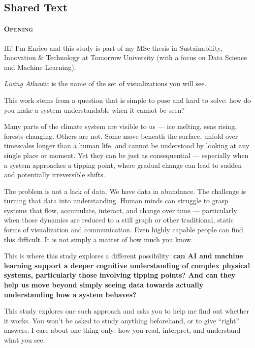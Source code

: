 \subsection{Shared Text}
\label{subsec:b-shared}

\small

\paragraph{\textsc{Opening}}
Hi! I'm Enrico and this study is part of my MSc thesis in Sustainability, Innovation \&
Technology at Tomorrow University (with a focus on Data Science and Machine Learning).

\emph{Living Atlantic} is the name of the set of visualizations you will see.

This work stems from a question that is simple to pose and hard to solve: how do you make a
system understandable when it cannot be seen?

Many parts of the climate system are visible to us --- ice melting, seas rising, forests
changing. Others are not. Some move beneath the surface, unfold over timescales longer than a
human life, and cannot be understood by looking at any single place or moment. Yet they can be
just as consequential --- especially when a system approaches a tipping point, where gradual
change can lead to sudden and potentially irreversible shifts.

The problem is not a lack of data. We have data in abundance. The challenge is turning that
data into understanding. Human minds can struggle to grasp systems that flow, accumulate,
interact, and change over time --- particularly when those dynamics are reduced to a still
graph or other traditional, static forms of visualization and communication. Even highly
capable people can find this difficult. It is not simply a matter of how much you know.

This is where this study explores a different possibility: \textbf{can AI and machine learning
support a deeper cognitive understanding of complex physical systems, particularly those
involving tipping points? And can they help us move beyond simply seeing data towards actually
understanding how a system behaves?}

This study explores one such approach and asks you to help me find out whether it works. You
won't be asked to study anything beforehand, or to give ``right'' answers. I care about one
thing only: how you read, interpret, and understand what you see.

